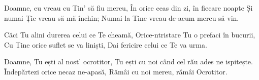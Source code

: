 
\beginverse
Doamne, eu vreau cu Tin’ să fiu mereu,
În orice ceas din zi, în fiecare noapte
Și numai Ție vreau să mă închin;
Numai la Tine vreau de-acum mereu să vin.
\endverse

\beginchorus
Căci Tu alini durerea celui ce Te cheamă,
Orice-ntristare Tu o prefaci în bucurii,
Cu Tine orice suflet se va liniști,
Dai fericire celui ce Te va urma.
\endchorus

\beginverse
Doamne, Tu ești al nost’ ocrotitor,
Tu ești cu noi când cel rău ades ne ispitește.
Îndepărtezi orice necaz ne-apasă,
Rămâi cu noi mereu, rămâi Ocrotitor.
\endverse

\endsong